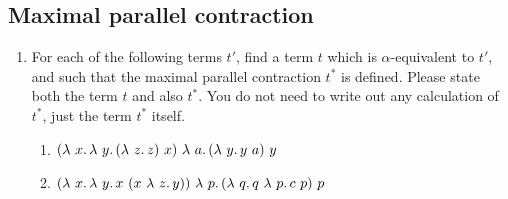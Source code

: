 \subsection{Maximal parallel contraction}
    
\begin{enumerate}
\item For each of the following terms $t'$, find a term $t$ which is $\alpha$-equivalent to $t'$, and
  such that the maximal parallel contraction $t^*$ is defined.  Please
  state both the term $t$ and also $t^*$.  You do not need to write out any calculation of $t^*$, just the term $t^*$ itself.
  \begin{enumerate}
  \item $(\lam{x}{\lam{y}{(\lam{z}{z})\ x}})\ \lam{a}{(\lam{y}{y\ a})\ y}$
  \item $(\lam{x}{\lam{y}{x\ (x\ \lam{z}{y})}})\ \lam{p}{(\lam{q}{q\ \lam{p}{c\ p}})\ p}$
  \end{enumerate}
  \end{enumerate}



